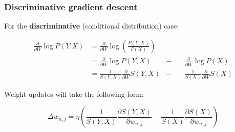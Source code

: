 \documentclass[usenames,dvipsnames]{beamer}
\newcommand{\ddspn}[2]{\frac{\partial#1}{\partial#2}}
\begin{document}
\begin{frame}
  \frametitle{Discriminative gradient descent}

  For the \textbf{discriminative} (conditional distribution) case:

  \begin{align*}
    \ddspn{}{W}\log P(Y|X)&=\ddspn{}{W}\log\left(\frac{P(Y,X)}{P(X)}\right)\\
                          &=\ddspn{}{W}\log P(Y,X)&-\quad&\ddspn{}{W}\log P(X)\\
                          &=\frac{1}{S(Y,X)}\ddspn{}{W}S(Y,X)&-\quad&\frac{1}{S(X)}\ddspn{}{W}S(X)
  \end{align*}

  Weight updates will take the following form:

  \begin{equation*}
    \Delta w_{n,j}=\eta\left(\frac{1}{S(Y,X)}\ddspn{S(Y,X)}{w_{n,j}}-\frac{1}{S(X)}
      \ddspn{S(X)}{w_{n,j}}\right)
  \end{equation*}

\end{frame}
\end{document}
